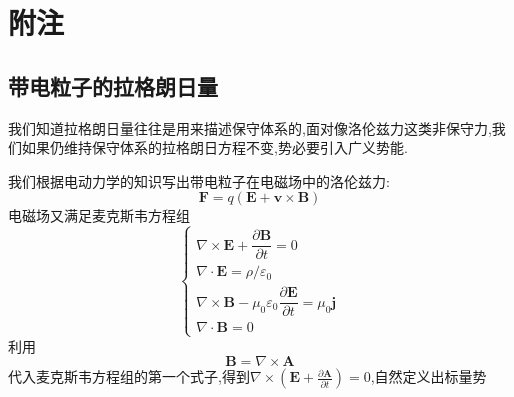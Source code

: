 \ifx\allfiles\undefined



	\else
	\fi
	
%
%

\chapter{附注}
\section{带电粒子的拉格朗日量}
我们知道拉格朗日量往往是用来描述保守体系的,面对像洛伦兹力这类非保守力,我们如果仍维持保守体系的拉格朗日方程不变,势必要引入广义势能.

我们根据电动力学的知识写出带电粒子在电磁场中的洛伦兹力:
\begin{equation}
	\boldsymbol F=q(\boldsymbol E+\boldsymbol v\times \boldsymbol  B)
\end{equation}
电磁场又满足麦克斯韦方程组
\begin{equation}
	\left\{\begin{array}{l}\nabla \times \boldsymbol{E}+\dfrac{\partial \boldsymbol{B}}{\partial t}=0 \\ \nabla \cdot \boldsymbol{E}=\rho / \varepsilon_{0} \\ \nabla \times \boldsymbol{B}-\mu_{0} \varepsilon_{0} \dfrac{\partial \boldsymbol{E}}{\partial t}=\mu_{0} \boldsymbol{j} \\ \nabla \cdot \boldsymbol{B}=0\end{array}\right.
\end{equation}
利用
\begin{equation}
	\boldsymbol{B}=\nabla \times \boldsymbol{A}
\end{equation}
代入麦克斯韦方程组的第一个式子,得到$\nabla \times\left(\boldsymbol{E}+\frac{\partial \boldsymbol{A}}{\partial t}\right)=0$,自然定义出标量势

